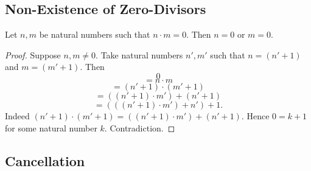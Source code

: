 \documentclass[10pt]{article}
\begin{document}
  \subsection{Non-Existence of Zero-Divisors}

  \begin{forthel}
    \begin{proposition}
      Let $n, m$ be natural numbers such that $n \cdot m = 0$.
      Then $n = 0$ or $m = 0$.
    \end{proposition}
    \begin{proof}
      Suppose $n, m \neq 0$.
      Take natural numbers $n', m'$ such that $n = (n' + 1)$ and $m = (m' + 1)$.
      Then
      \[  0                                     \]
      \[    = n \cdot m                         \]
      \[    = (n' + 1) \cdot (m' + 1)           \]
      \[    = ((n' + 1) \cdot m') + (n' + 1)    \]
      \[    = (((n' + 1) \cdot m') + n') + 1.   \]
      Indeed $(n' + 1) \cdot (m' + 1) = ((n' + 1) \cdot m') + (n' + 1)$.
      Hence $0 = k + 1$ for some natural number $k$.
      Contradiction.
    \end{proof}
  \end{forthel}


  \subsection{Cancellation}
\end{document}
